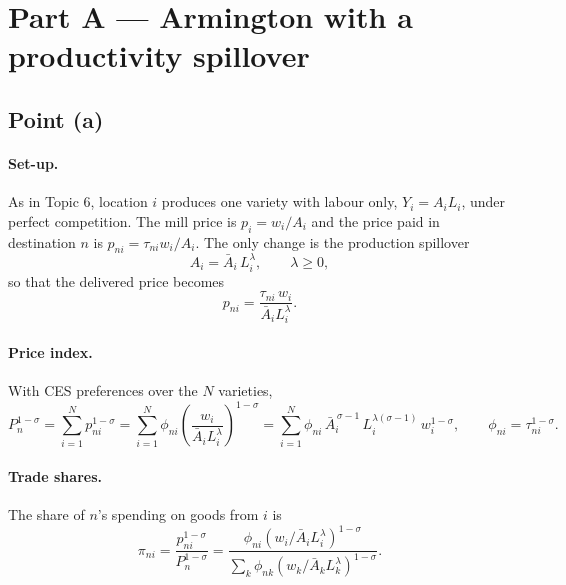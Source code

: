 \documentclass[11pt,a4paper]{article}
\begin{document}
\section*{Part A --- Armington with a productivity spillover}

\subsection*{Point (a)}

\paragraph{Set-up.} As in Topic 6, location $i$ produces one variety with labour only, $Y_i = A_iL_i$, under perfect competition. The mill price is $p_i = w_i/A_i$ and the price paid in destination $n$ is $p_{ni} = \tau_{ni}w_i/A_i$. The only change is the production spillover
\begin{equation}
A_i = \bar A_i\,L_i^{\lambda}, \qquad \lambda \ge 0,
\end{equation}
so that the delivered price becomes
\begin{equation}
p_{ni} = \frac{\tau_{ni}\,w_i}{\bar A_i L_i^{\lambda}} .
\end{equation}

\paragraph{Price index.} With CES preferences over the $N$ varieties,
\begin{equation}
P_n^{1-\sigma} = \sum_{i=1}^{N} p_{ni}^{1-\sigma}
= \sum_{i=1}^{N} \phi_{ni}\left(\frac{w_i}{\bar A_i L_i^{\lambda}}\right)^{1-\sigma}
= \sum_{i=1}^{N} \phi_{ni}\,\bar A_i^{\,\sigma-1}\,L_i^{\lambda(\sigma-1)}\,w_i^{1-\sigma},
\qquad \phi_{ni} = \tau_{ni}^{1-\sigma}.
\end{equation}

\paragraph{Trade shares.} The share of $n$'s spending on goods from $i$ is
\begin{equation}
\pi_{ni} = \frac{p_{ni}^{1-\sigma}}{P_n^{1-\sigma}}
= \frac{\phi_{ni}\left(w_i/\bar A_i L_i^{\lambda}\right)^{1-\sigma}}
       {\sum_{k}\phi_{nk}\left(w_k/\bar A_k L_k^{\lambda}\right)^{1-\sigma}} .
\end{equation}
\end{document}
